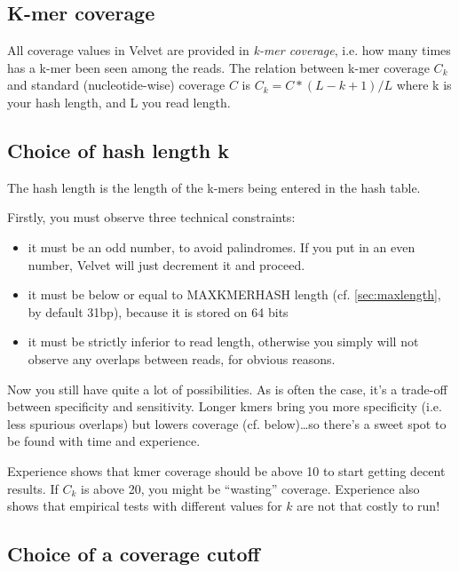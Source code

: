 \documentclass{article}
\begin{document}
\subsection{K-mer coverage}

All coverage values in Velvet are provided in \emph{k-mer coverage}, i.e. how many times has a k-mer been seen among the reads. The relation between k-mer coverage $C_k$ and standard (nucleotide-wise) coverage $C$ is $C_k = C * (L - k + 1) / L$ where k is your hash length, and L you read length. 

\subsection{Choice of hash length k}

\label{sec:kmercov}

The hash length is the length of the k-mers being entered in the hash table.

Firstly, you must observe three technical constraints:
\begin{itemize}
\item it must be an odd number, to avoid palindromes. If you put in an even number, Velvet will just decrement it and proceed.
\item it must be below or equal to MAXKMERHASH length (cf. \ref{sec:maxlength}, by default 31bp), because it is stored on 64 bits
\item it must be strictly inferior to read length, otherwise you simply will not observe any overlaps between reads, for obvious reasons.
\end{itemize}

Now you still have quite a lot of possibilities. As is often the case, it's a trade-off between specificity and sensitivity. Longer kmers bring you more specificity (i.e. less spurious overlaps) but lowers coverage (cf. below)\ldots so there's a sweet spot to be found with time and experience.

Experience shows that kmer coverage should be above 10 to start getting decent results. If $C_k$ is above 20, you might be ``wasting'' coverage. Experience also shows that empirical tests with different values for $k$ are not that costly to run!

\subsection{Choice of a coverage cutoff}

\label{sec:covcutoff}
\end{document}
